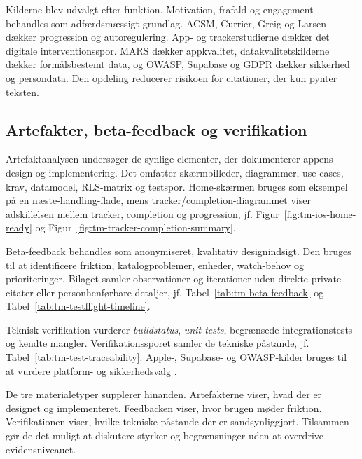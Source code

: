 Kilderne blev udvalgt efter funktion. Motivation, frafald og engagement behandles som adfærdsmæssigt grundlag. ACSM, Currier, Greig og Larsen dækker progression og autoregulering. App- og trackerstudierne dækker det digitale interventionsspor. MARS dækker appkvalitet, datakvalitetskilderne dækker formålsbestemt data, og OWASP, Supabase og GDPR dækker sikkerhed og persondata. Den opdeling reducerer risikoen for citationer, der kun pynter teksten.

\subsection{Artefakter, beta-feedback og verifikation}

Artefaktanalysen undersøger de synlige elementer, der dokumenterer appens design og implementering. Det omfatter skærmbilleder, diagrammer, use cases, krav, datamodel, RLS-matrix og testspor. Home-skærmen bruges som eksempel på en næste-handling-flade, mens tracker/completion-diagrammet viser adskillelsen mellem tracker, completion og progression, jf. Figur~\ref{fig:tm-ios-home-ready} og Figur~\ref{fig:tm-tracker-completion-summary}.

Beta-feedback behandles som anonymiseret, kvalitativ designindsigt. Den bruges til at identificere friktion, katalogproblemer, enheder, watch-behov og prioriteringer. Bilaget samler observationer og iterationer uden direkte private citater eller personhenførbare detaljer, jf. Tabel~\ref{tab:tm-beta-feedback} og Tabel~\ref{tab:tm-testflight-timeline}.

Teknisk verifikation vurderer \emph{buildstatus}, \emph{unit tests}, begrænsede integrationstests og kendte mangler. Verifikationssporet samler de tekniske påstande, jf. Tabel~\ref{tab:tm-test-traceability}. Apple-, Supabase- og OWASP-kilder bruges til at vurdere platform- og sikkerhedsvalg \cite{apple_swiftui_docs,apple_activitykit_live_data_docs,apple_watchconnectivity_docs,owasp2024_masvs,supabase_rls_docs}.

De tre materialetyper supplerer hinanden. Artefakterne viser, hvad der er designet og implementeret. Feedbacken viser, hvor brugen møder friktion. Verifikationen viser, hvilke tekniske påstande der er sandsynliggjort. Tilsammen gør de det muligt at diskutere styrker og begrænsninger uden at overdrive evidensniveauet.

